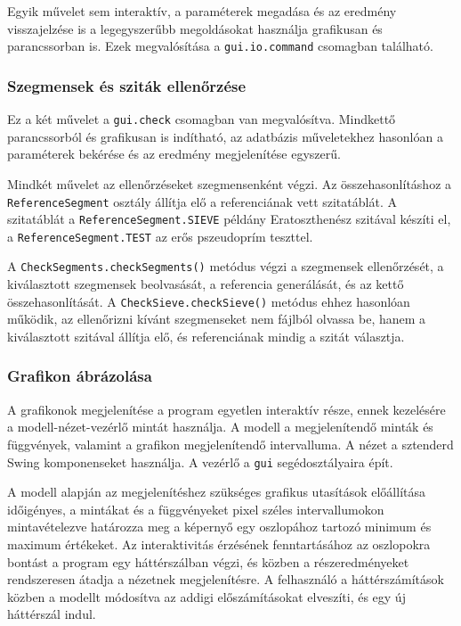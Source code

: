 Egyik művelet sem interaktív, a paraméterek megadása és az eredmény visszajelzése is
a legegyszerűbb megoldásokat használja grafikusan és parancssorban is.
Ezek megvalósítása a \texttt{gui.io.command} csomagban található.

\subsubsection{Szegmensek és sziták ellenőrzése}

Ez a két művelet a \texttt{gui.check} csomagban van megvalósítva.
Mindkettő parancssorból és grafikusan is indítható, az adatbázis műveletekhez hasonlóan a paraméterek bekérése és az eredmény megjelenítése egyszerű.

Mindkét művelet az ellenőrzéseket szegmensenként végzi.
Az összehasonlításhoz a \texttt{ReferenceSegment} osztály állítja elő a referenciának vett szitatáblát.
A szitatáblát a \texttt{ReferenceSegment.SIEVE} példány Eratoszthenész szitával készíti el, a \texttt{ReferenceSegment.TEST} az erős pszeudoprím teszttel.

A \texttt{CheckSegments.checkSegments()} metódus végzi a szegmensek ellenőrzését, a kiválasztott szegmensek beolvasását, a referencia generálását, és az kettő összehasonlítását.
A \texttt{CheckSieve.checkSieve()} metódus ehhez hasonlóan működik, az ellenőrizni kívánt szegmenseket nem fájlból olvassa be, hanem a kiválasztott szitával állítja elő, és referenciának mindig a szitát választja.

\subsubsection{Grafikon ábrázolása}

A grafikonok megjelenítése a program egyetlen interaktív része, ennek kezelésére a modell-nézet-vezérlő mintát használja.
A modell a megjelenítendő minták és függvények, valamint a grafikon megjelenítendő intervalluma.
A nézet a sztenderd Swing komponenseket használja.
A vezérlő a \texttt{gui} segédosztályaira épít.

A modell alapján az megjelenítéshez szükséges grafikus utasítások előállítása időigényes, a mintákat és a függvényeket pixel széles intervallumokon mintavételezve határozza meg a képernyő egy oszlopához tartozó minimum és maximum értékeket.
Az interaktivitás érzésének fenntartásához az oszlopokra bontást a program egy háttérszálban végzi, és közben a részeredményeket rendszeresen átadja a nézetnek megjelenítésre.
A felhasználó a háttérszámítások közben a modellt módosítva az addigi előszámításokat elveszíti, és egy új háttérszál indul.

